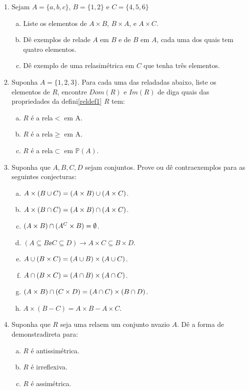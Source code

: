 \begin{enumerate}[{\bf 1.}]
\item Sejam $A=\{a,b,c\}$, $B=\{1,2\}$ e $C=\{4,5,6\}$
\begin{enumerate}[a)]
\item Liste os elementos de $A\times B$, $B\times A$, e $A\times C$.
\item D\^e exemplos de rela\coes de $A$ em $B$ e de $B$ em $A$, cada uma dos quais tem quatro elementos.
\item D\^e exemplo de uma rela\cao sim\'etrica em $C$ que tenha tr\^es elementos.
\end{enumerate}

\item Suponha $A=\{1,2,3\}$. Para cada uma das rela\coes dadas abaixo, liste os elementos de $R$, encontre $Dom(R)$ e $Im(R)$ de diga quais das propriedades da defini\cao \ref{reldef1} $R$ tem:
\begin{enumerate}[a)]
\item $R$ \'e a rela\cao $<$ em A. 
\item $R$ \'e a rela\cao $\geq$ em A.
\item $R$ \'e a rela\cao $\subset$ em $\mathbb{P}(A)$.
\end{enumerate}

\item Suponha que $A,B,C,D$ sejam conjuntos. Prove ou d\^e contraexemplos para as seguintes conjecturas:
\begin{enumerate}[a)]
\item $A\times(B\cup C)= (A\times B)\cup(A\times C)$.
\item $A\times(B\cap C)=(A\times B)\cap(A\times C)$.
\item $(A\times B)\cap(A^C\times B)=\emptyset$.
\item $(A\subseteq B\ee C\subseteq D)\to A\times C\subseteq B\times D$.
\item $A\cup(B\times C)=(A\cup B)\times(A\cup C)$.
\item $A\cap(B\times C)=(A\cap B)\times(A\cap C)$.
\item $(A\times B)\cap(C\times D)=(A\cap C)\times(B\cap D)$.
\item $A\times(B-C)=A\times B-A\times C$.
\end{enumerate}

\item Suponha que $R$ seja uma rela\cao em um conjunto n\ao vazio $A$. D\^e a forma de demonstra\cao direta para:
\begin{enumerate}[a)]
\item $R$ \'e antissim\'etrica.
\item $R$ \'e irreflexiva.
\item $R$ \'e assim\'etrica.
\end{enumerate}


\end{enumerate}
